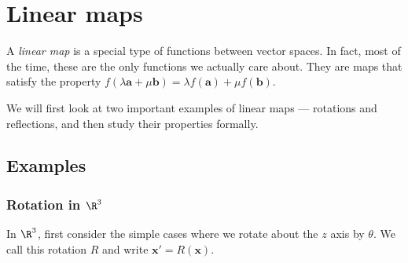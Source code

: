 \documentclass[a4paper]{article}
\begin{document}
\section{Linear maps}
A \emph{linear map} is a special type of functions between vector spaces. In fact, most of the time, these are the only functions we actually care about. They are maps that satisfy the property $f(\lambda \mathbf{a} + \mu \mathbf{b}) = \lambda f(\mathbf{a}) + \mu f(\mathbf{b})$.

We will first look at two important examples of linear maps --- rotations and reflections, and then study their properties formally.
\subsection{Examples}
\subsubsection{Rotation in \texorpdfstring{$\R^3$}{R3}}
In $\R^3$, first consider the simple cases where we rotate about the $z$ axis by $\theta$. We call this rotation $R$ and write $\mathbf{x}' = R(\mathbf{x})$.
\end{document}
